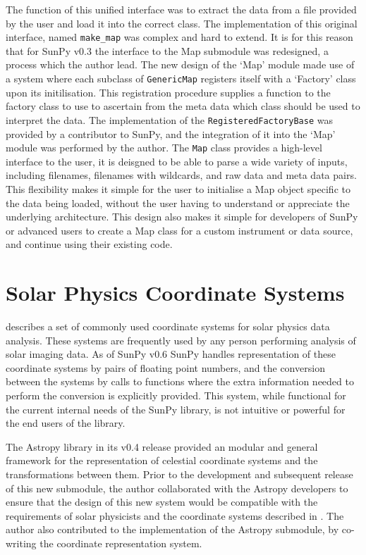 The function of this unified interface was to extract the data from a file provided by the user and load it into the correct class.
The implementation of this original interface, named \verb|make_map| was complex and hard to extend.
It is for this reason that for SunPy v0.3 the interface to the Map submodule was redesigned, a process which the author lead.
The new design of the `Map' module made use of a system where each subclass of \verb|GenericMap| registers itself with a `Factory' class upon its initilisation.
This registration procedure supplies a function to the factory class to use to ascertain from the meta data which class should be used to interpret the data.
The implementation of the \verb|RegisteredFactoryBase| was provided by a contributor to SunPy, and the integration of it into the `Map' module was performed by the author.
The \verb|Map| class provides a high-level interface to the user, it is deisgned to be able to parse a wide variety of inputs, including filenames, filenames with wildcards, and raw data and meta data pairs.
This flexibility makes it simple for the user to initialise a Map object specific to the data being loaded, without the user having to understand or appreciate the underlying architecture.
This design also makes it simple for developers of SunPy or advanced users to create a Map class for a custom instrument or data source, and continue using their existing code.

\section{Solar Physics Coordinate Systems}

\cite{thompson2006} describes a set of commonly used coordinate systems for solar physics data analysis.
These systems are frequently used by any person performing analysis of solar imaging data.
As of SunPy v0.6 SunPy handles representation of these coordinate systems by pairs of floating point numbers, and the conversion between the systems by calls to functions where the extra information needed to perform the conversion is explicitly provided.
This system, while functional for the current internal needs of the SunPy library, is not intuitive or powerful for the end users of the library.

The Astropy library \citep{theastropycollaboration2013} in its v0.4 release provided an modular and general framework for the representation of celestial coordinate systems and the transformations between them.
Prior to the development and subsequent release of this new submodule, the author collaborated with the Astropy developers to ensure that the design of this new system would be compatible with the requirements of solar physicists and the coordinate systems described in \cite{thompson2006}.
The author also contributed to the implementation of the Astropy submodule, by co-writing the coordinate representation system.

